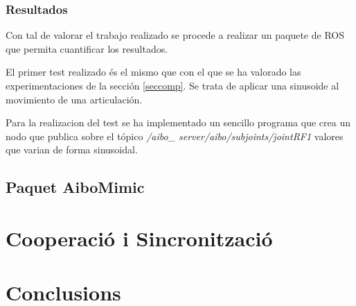\documentclass[12pt,a4paper,final,twoside]{article}
\begin{document}
\subsubsection{Resultados}
Con tal de valorar el trabajo realizado se procede a realizar un paquete de ROS que permita cuantificar los resultados.

El primer test realizado és el mismo que con el que se ha valorado las experimentaciones de la sección \ref{seccomp}. Se trata de aplicar una sinusoide al movimiento de una articulación.

Para la realizacion del test se ha implementado un sencillo programa que crea un nodo que publica sobre el tópico \textit{/aibo\_ server/aibo/subjoints/jointRF1} 	valores que varian de forma sinusoidal.  

\subsection{Paquet AiboMimic}
\section{Cooperació i Sincronització}
\section*{Conclusions}
\end{document}
